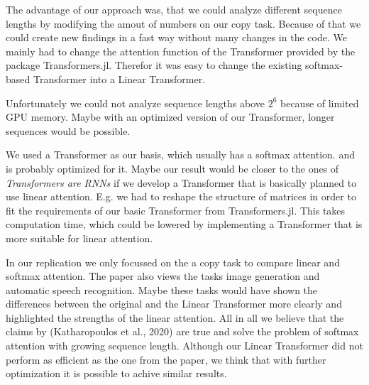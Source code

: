 \documentclass[DIV=13,fontsize=11pt]{scrartcl}
\begin{document}
The advantage of our approach was, that we could analyze different sequence lengths by modifying the amout of numbers on our copy task. Because of that we could create new findings in a fast way without many changes in the code. We mainly had to change the attention function of the Transformer provided by the package Transformers.jl. Therefor it was easy to change the existing softmax-based Transformer into a Linear Transformer.

Unfortunately we could not analyze sequence lengths above \(2^6\) because of limited GPU memory. Maybe with an optimized version of our Transformer, longer sequences would be possible. 

We used a Transformer as our basis, which usually has a softmax attention. and is probably optimized for it. Maybe our result would be closer to the ones of \textit{Transformers are RNNs} if we develop a Transformer that is basically planned to use linear attention. E.g. we had to reshape the structure of matrices in order to fit the requirements of our basic Transformer from Transformers.jl. This takes computation time, which could be lowered by implementing a Transformer that is more suitable for linear attention.

In our replication we only focussed on the a copy task to compare linear and softmax attention. The paper also views the tasks image generation and automatic speech recognition. Maybe these tasks would have shown the differences between the original and the Linear Transformer more clearly and highlighted the strengths of the linear attention. 
All in all we believe that the claims by (Katharopoulos et al., 2020) are true and solve the problem of softmax attention with growing sequence length. Although our Linear Transformer did not perform as efficient as the one from the paper, we think that with further optimization it is possible to achive similar results.
\end{document}
